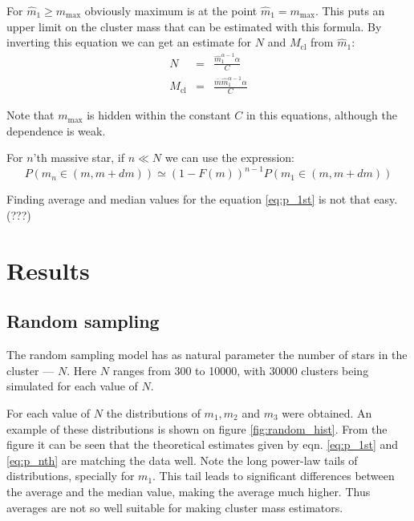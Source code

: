 \documentclass[a4paper,10pt]{article}
\newcommand{\Mmax}{m_{\mathrm{max}}}
\newcommand{\Mcl}{M_{\mathrm{cl}}}
\begin{document}
For $\hat{m}_1 \geq \Mmax$ obviously maximum is at the point $\hat{m}_1 = \Mmax$. 
This puts an upper limit on the cluster mass that can be estimated with this formula.
By inverting this equation we can get an estimate for $N$ and $\Mcl$ from $\hat{m}_1$:
\begin{eqnarray}
  N &=& \frac{\hat{m}_1^{\alpha-1} \alpha}{C} \nonumber \\ 
  \Mcl &=& \frac{\bar{m} \hat{m}_1^{\alpha-1} \alpha}{C} \label{eq:mhat_est}
\end{eqnarray} 

Note that $\Mmax$ is hidden within the constant $C$ in this equations, although the dependence is weak.

For $n$'th massive star, if $n \ll N$ we can use the expression:
\begin{equation}\label{eq:p_nth}
 P(m_n \in (m, m+dm)) \simeq \left( 1 - F(m) \right)^{n-1} P(m_1 \in (m, m+dm))
\end{equation} 

Finding average and median values for the equation \ref{eq:p_1st} is not that easy. (???)
% 
% 

\section{Results}
\subsection{Random sampling}\label{sec:random}
The random sampling model has as natural parameter the number of stars in the cluster --- $N$. Here $N$ ranges from 300 to 10000, with 30000 clusters being simulated for each value of $N$.

For each value of $N$ the distributions of $m_1, m_2$ and $m_3$ were obtained. An example of these distributions is shown on figure \ref{fig:random_hist}. From the figure it can be seen that the theoretical estimates given by eqn. \ref{eq:p_1st} and \ref{eq:p_nth} are matching the data well.
Note the long power-law tails of distributions, specially for $m_1$. This tail leads to significant differences between the average and the median value, making the average much higher. Thus averages are not so well suitable for making cluster mass estimators.
\end{document}
